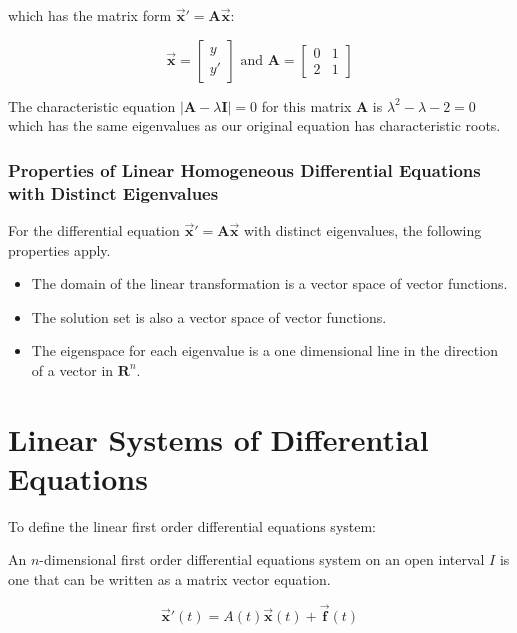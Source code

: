 \documentclass[12pt, landscape, twocolumn]{article}
\newcommand{\ma}[0]{\mathbf{A} }        %
\let\oldvec\vec
\renewcommand{\vec}[1]{\oldvec{\mathbf{ #1 } } }                    %
\begin{document}
        which has the matrix form $\vec{x}\prime = \ma \vec{x}$:

        \[ \vec{x} = \left[ \begin{array}{r}
            y\\
            y\prime
        \end{array} \right] \text{ and }
        \ma = \left[ \begin{array}{rr}
            0 & 1\\
            2 & 1
        \end{array} \right] \]

    The characteristic equation $| \ma - \lambda \mathbf{I} | = 0$ for this matrix $\ma$ is $\lambda^2 - \lambda - 2 = 0$ which has the same eigenvalues as our original equation has characteristic roots.

        \subsubsection{Properties of Linear Homogeneous Differential Equations with Distinct Eigenvalues}
        For the differential equation $\vec{x}\prime = \ma\vec{x}$ with distinct eigenvalues, the following properties apply.
            \begin{itemize}
                \item The domain of the linear transformation is a vector space of vector functions.
                \item The solution set is also a vector space of vector functions.
                \item The eigenspace for each eigenvalue is a one dimensional line in the direction of a vector in $\mathbf{R}^n$.
            \end{itemize}

\section{Linear Systems of Differential Equations}
To define the linear first order differential equations system:

An $n$-dimensional first order differential equations system on an open interval $I$ is one that can be written as a matrix vector equation.

    \begin{equation}\label{eq:desystem_vector_form}
        \vec{x} \prime (t) = A(t) \vec{x}(t) + \vec{f}(t)
    \end{equation}
\end{document}
